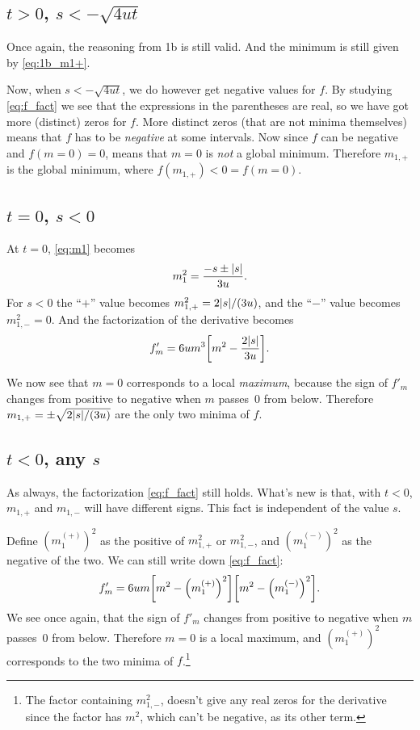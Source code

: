 \documentclass[11pt,letter, swedish, english
]{article}
\begin{document}
\subsection{$t>0$, $s<-\sqrt{4ut}$}
Once again, the reasoning from 1b is still valid. And the minimum is
still given by \eqref{eq:1b_m1+}. 

Now, when $s<-\sqrt{4ut}$, we do however get negative values
for $f$. By studying \eqref{eq:f_fact} we see that the expressions in
the parentheses are real, so we have got more (distinct) zeros for
$f$. More distinct zeros (that are not minima themselves) means that
$f$ has to be \emph{negative} at some intervals. Now since $f$ can be
negative and $f(m=0)=0$, means that $m=0$ is \emph{not} a global
minimum. Therefore $m_{1,+}$ is the global minimum\footnotemark{},
where $f(m_{1,+})<0=f(m=0)$.  


\subsection{$t=0$, $s<0$}
At $t=0$, \eqref{eq:m1} becomes
\begin{equation}\label{eq:m1_t=0}
m_1^2=\frac{-s\pm\abs{s}}{3u}.
\end{equation}
For $s<0$ the ``$+$'' value becomes $m_{1,+}^2=2\abs{s}/(3u)$, and
the ``$-$'' value becomes $m_{1,-}^2=0$. And the factorization of the
derivative becomes
\begin{equation}%
f'_m=6um^3\qty[m^2-\frac{2\abs{s}}{3u}].
\end{equation}

We now see that $m=0$ corresponds to a local \emph{maximum}, because
the sign of $f'_m$ changes from positive to negative when $m$ passes~0
from below. Therefore $m_{1,+}=\pm\sqrt{2\abs{s}/(3u)}$ are the only
two minima of $f$. 

\subsection{$t<0$, any $s$}
As always, the factorization \eqref{eq:f_fact} still holds. What's new
is that, with $t<0$, $m_{1,+}$ and $m_{1,-}$ will have different
signs. This fact is independent of the value $s$. 

Define $(m_1^{(+)})^2$ as the positive of $m_{1,+}^2$ or $m_{1,-}^2$, and
$(m_1^{(-)})^2$ as the negative of the two. We can still write down
\eqref{eq:f_fact}:
\begin{equation}\label{eq:f'_fact}
f'_m=6um\qty[m^2-\qty(m_{1}^{(+)})^2]\qty[m^2-\qty(m_{1}^{(-)})^2].
\end{equation}
We see once again, that the sign of $f'_m$ changes from positive to
negative when $m$ passes~0 from below. Therefore $m=0$ is a local
maximum, and $(m_{1}^{(+)})^2$ corresponds to the two minima of
$f$.\footnote{The factor containing $m_{1,-}^2$, doesn't give any real
zeros for the derivative since the factor has $m^2$, which can't be
negative, as its other term.}
\end{document}
